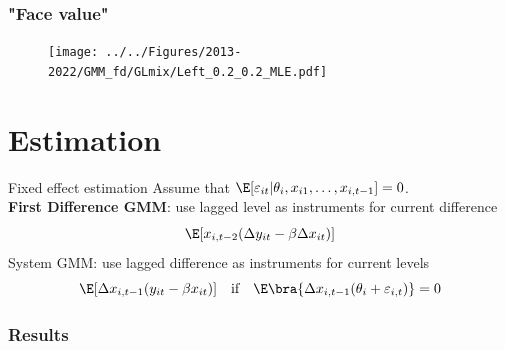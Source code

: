 \documentclass[10pt,mathserif,aspectratio=169]{beamer}
\begin{document}


\begin{frame}
  \frametitle{"Face value"}
  \begin{figure}
    \centering
    \texttt{[image: ../../Figures/2013-2022/GMM\_fd/GLmix/Left\_0.2\_0.2\_MLE.pdf]}
  \end{figure}
\end{frame}

\section{Estimation}
\begin{frame}{Fixed effect estimation}
  Assume that $\E[\varepsilon_{it}|\theta_i,x_{i1},\ldots,x_{i,t-1}]=0$.\\
  \textbf{First Difference GMM}: use lagged level as instruments for current difference
  \begin{equation*}
    \E[x_{i,t-2}(\Delta y_{it}-\beta \Delta x_{it})]
  \end{equation*}
  System GMM: use lagged difference as instruments for current levels
  \begin{equation*}
    \E[\Delta x_{i,t-1}(y_{it}-\beta x_{it})] \quad \text{if}\quad \E\bra{\Delta x_{i,t-1}(\theta_i+\varepsilon_{i,t})}=0
  \end{equation*}
\end{frame}

\begin{frame}
  \frametitle{Results}
  \begin{table}\fontsize{6pt}{6pt}\selectfont
    
  \end{table}
\end{frame}
\end{document}
